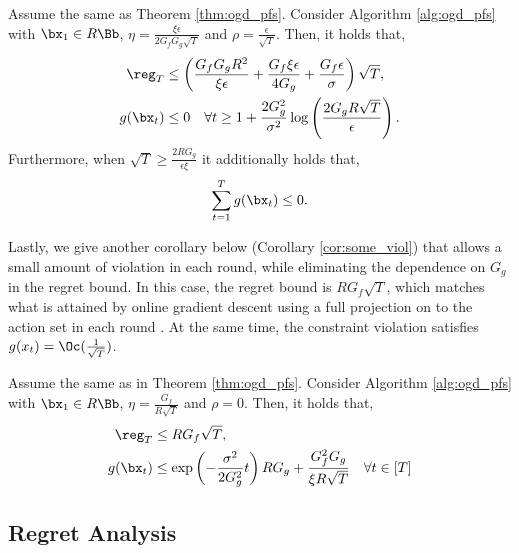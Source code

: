 \begin{corollary}
    \label{cor:late_sat}
    Assume the same as Theorem \ref{thm:ogd_pfs}.
    Consider Algorithm \ref{alg:ogd_pfs} with $\bx_1 \in R \Bb$, $\eta = \frac{\xi \epsilon}{2 G_f G_g \sqrt{T}}$ and $\rho = \frac{\epsilon}{\sqrt{T}}$.
    Then, it holds that,
    \begin{align*}
        \reg_T & \leq \left(\frac{G_f G_g R^2}{\xi \epsilon} + \frac{G_f \xi \epsilon}{4 G_g} + \frac{G_f \epsilon}{\sigma} \right) \sqrt{T},\\
        g(\bx_t) & \leq 0 \quad \forall t \geq 1 + \frac{2 G_g^2}{\sigma^2} \log\left( \frac{2 G_g R \sqrt{T}}{\epsilon} \right).
    \end{align*}
    Furthermore, when $\sqrt{T} \geq \frac{2 R G_g}{\epsilon \xi}$ it additionally holds that,
    \begin{equation*}
        \sum_{t=1}^{T} g(\bx_t) \leq 0.
    \end{equation*}
\end{corollary}

Lastly, we give another corollary below (Corollary \ref{cor:some_viol}) that allows a small amount of violation in each round, while eliminating the dependence on $G_g$ in the regret bound.
In this case, the regret bound is $R G_f \sqrt{T}$, which matches what is attained by online gradient descent using a full projection on to the action set in each round \cite{zinkevich2003online}.
At the same time, the constraint violation satisfies $g(x_t) = \Oc(\frac{1}{\sqrt{T}})$.

\begin{corollary}
    \label{cor:some_viol}
    Assume the same as in Theorem \ref{thm:ogd_pfs}.
    Consider Algorithm \ref{alg:ogd_pfs} with $\bx_1 \in R \Bb$, $\eta = \frac{G_f}{R \sqrt{T}}$ and $\rho = 0$.
    Then, it holds that,
    \begin{align*}
        \reg_T & \leq R G_f \sqrt{T},\\
        g(\bx_t) & \leq \exp \left( -\frac{\sigma^2}{2 G_g^2} t \right) R G_g + \frac{G^2_f G_g}{\xi R \sqrt{T}} \quad \forall t \in [T]
    \end{align*}
\end{corollary}

\subsection{Regret Analysis}
\label{sec:reg_anal}

